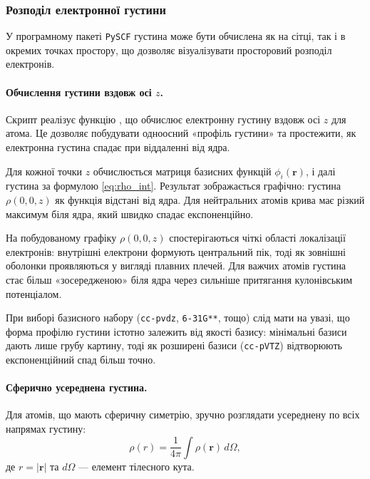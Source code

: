 \subsubsection{Розподіл електронної густини}


У програмному пакеті \texttt{PySCF} густина може бути обчислена як на сітці, так і в окремих точках простору, що дозволяє візуалізувати просторовий розподіл електронів.


\paragraph{Обчислення густини вздовж осі $z$.}


Скрипт  реалізує функцію , що обчислює електронну густину вздовж осі $z$ для атома.
Це дозволяє побудувати одноосний «профіль густини» та простежити, як електронна густина спадає при віддаленні від ядра.

Для кожної точки $z$ обчислюється матриця базисних функцій $\phi_i(\mathbf{r})$, і далі густина за формулою
\eqref{eq:rho_int}.
Результат зображається графічно: густина $\rho(0,0,z)$ як функція відстані від ядра.
Для нейтральних атомів крива має різкий максимум біля ядра, який швидко спадає експоненційно.

На побудованому графіку $\rho(0,0,z)$ спостерігаються чіткі області локалізації електронів:
внутрішні електрони формують центральний пік, тоді як зовнішні оболонки проявляються у вигляді плавних плечей.
Для важчих атомів густина стає більш «зосередженою» біля ядра через сильніше притягання кулонівським потенціалом.

При виборі базисного набору (\texttt{cc-pvdz}, \texttt{6-31G**}, тощо) слід мати на увазі, що форма профілю густини істотно залежить від якості базису:
мінімальні базиси дають лише грубу картину, тоді як розширені базиси (\texttt{cc-pVTZ}) відтворюють експоненційний спад більш точно.


\paragraph{Сферично усереднена густина.}


Для атомів, що мають сферичну симетрію, зручно розглядати усереднену по всіх напрямах густину:
\[
\rho(r) = \frac{1}{4\pi} \int \rho(\mathbf{r}) \, d\Omega,
\]
де $r = |\mathbf{r}|$ та $d\Omega$ --- елемент тілесного кута.

